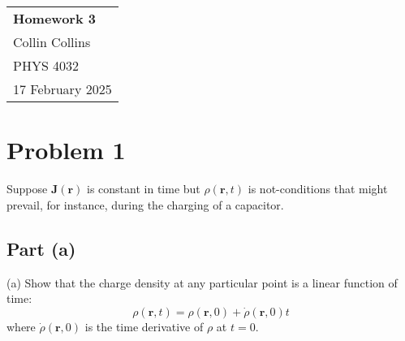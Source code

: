 \documentclass[a4paper,12pt]{article} %
\begin{document}



\thispagestyle{empty} %

\begin{tabular}{p{15.5cm}} %
{\large \bf Homework 3}
\\ Collin Collins \\
PHYS 4032\\
17 February 2025 \\
\hline %
\end{tabular} %

%
%
%
%
%

\section*{Problem 1}
Suppose $\mathbf{J}(\mathbf{r})$ is constant in time but $\rho(\mathbf{r}, t)$ is not-conditions that might prevail, for instance, during the charging of a capacitor.
\subsection*{Part (a)}
(a) Show that the charge density at any particular point is a linear function of time:
$$
\rho(\mathbf{r}, t)=\rho(\mathbf{r}, 0)+\dot{\rho}(\mathbf{r}, 0) t
$$
where $\dot{\rho}(\mathbf{r}, 0)$ is the time derivative of $\rho$ at $t=0$.
\end{document}
